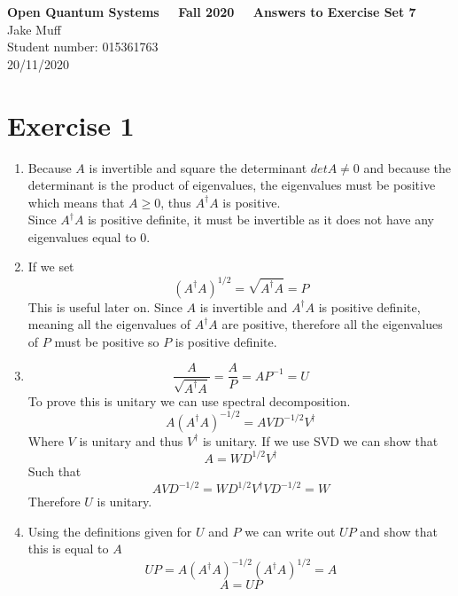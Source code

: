 \documentclass[12pt]{article}
\begin{document}
\normalsize

\baselineskip 14pt

\begin{center}
{\Large {\bf Open Quantum Systems \ \ Fall 2020 \ \  Answers to Exercise Set 7}}\\
{\large { Jake Muff}}\\
{Student number: 015361763}\\
{20/11/2020}
\end{center}



\section{Exercise 1}
\begin{enumerate}
    \item Because $A$ is invertible and square the determinant $det A \neq 0$ and because the determinant is the product of eigenvalues, the eigenvalues must be positive which means that $A \geq 0$, thus $A^{\dagger} A$ is positive. 
    \\
    Since $A^{\dagger} A$ is positive definite, it must be invertible as it does not have any eigenvalues equal to 0. 

    \item If we set 
    $$ (A^{\dagger} A) ^{1/2} = \sqrt{A^{\dagger} A} = P $$ 
    This is useful later on. Since $A$ is invertible and $A^{\dagger} A$ is positive definite, meaning all the eigenvalues of $A^{\dagger} A$ are positive, therefore all the eigenvalues of $P$ must be positive so $P$ is positive definite. 
    
    \item $$ \frac{A}{\sqrt{A^{\dagger} A}} = \frac{A}{P} = AP^{-1} = U $$
    To prove this is unitary we can use spectral decomposition. 
    $$ A(A^{\dagger} A)^{-1/2} = A V D^{-1/2} V^{\dagger} $$
    Where $V$ is unitary and thus $V^{\dagger}$ is unitary. If we use SVD we can show that 
    $$ A = W D^{1/2} V^{\dagger} $$
    Such that 
    $$ A V D^{-1/2} = W D^{1/2} V^{\dagger} V D^{-1/2} = W $$
    Therefore $U$ is unitary. 

    \item Using the definitions given for $U$ and $P$ we can write out $UP$ and show that this is equal to $A$
    $$ UP = A(A^{\dagger} A )^{-1/2} (A^{\dagger} A)^{1/2} = A $$
    $$ A = UP $$
\end{enumerate}
\end{document}
